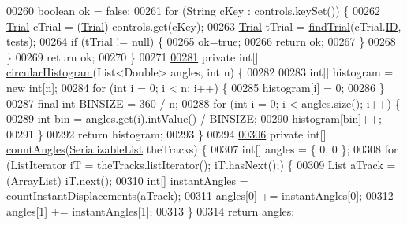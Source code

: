 \begin{DoxyCode}
{00260     \textcolor{keywordtype}{boolean} ok = \textcolor{keyword}{false};
00261     \textcolor{keywordflow}{for} (String cKey : controls.keySet()) \{
00262       \hyperlink{classdata_1_1_trial}{Trial} cTrial = (\hyperlink{classdata_1_1_trial}{Trial}) controls.get(cKey);
00263       \hyperlink{classdata_1_1_trial}{Trial} tTrial = \hyperlink{classanalysis_1_1_chemotaxis_a40fa55bdb0e1b4e7e0f9de92076ab2f9}{findTrial}(cTrial.\hyperlink{classdata_1_1_trial_a317298c3409575f71e43acd3f73ce295}{ID}, tests);
00264       \textcolor{keywordflow}{if} (tTrial != null) \{
00265         ok=\textcolor{keyword}{true};
00266         \textcolor{keywordflow}{return} ok;
00267       \}
00268     \}
00269     \textcolor{keywordflow}{return} ok;
00270   \}
00271 
\hypertarget{_chemotaxis_8java_source_l00281}{}\hyperlink{classanalysis_1_1_chemotaxis_a50fdf81a3460741674381622f16581cb}{00281}   \textcolor{keyword}{private} \textcolor{keywordtype}{int}[] \hyperlink{classanalysis_1_1_chemotaxis_a50fdf81a3460741674381622f16581cb}{circularHistogram}(List<Double> angles, \textcolor{keywordtype}{int} n) \{
00282 
00283     \textcolor{keywordtype}{int}[] histogram = \textcolor{keyword}{new} \textcolor{keywordtype}{int}[n];
00284     \textcolor{keywordflow}{for} (\textcolor{keywordtype}{int} i = 0; i < n; i++) \{
00285       histogram[i] = 0;
00286     \}
00287     \textcolor{keyword}{final} \textcolor{keywordtype}{int} BINSIZE = 360 / n;
00288     \textcolor{keywordflow}{for} (\textcolor{keywordtype}{int} i = 0; i < angles.size(); i++) \{
00289       \textcolor{keywordtype}{int} bin = angles.get(i).intValue() / BINSIZE;
00290       histogram[bin]++;
00291     \}
00292     \textcolor{keywordflow}{return} histogram;
00293   \}
00294 
\hypertarget{_chemotaxis_8java_source_l00306}{}\hyperlink{classanalysis_1_1_chemotaxis_a55deae924cf7ec2004a8fdcd8e185f94}{00306}   \textcolor{keyword}{private} \textcolor{keywordtype}{int}[] \hyperlink{classanalysis_1_1_chemotaxis_a55deae924cf7ec2004a8fdcd8e185f94}{countAngles}(\hyperlink{classdata_1_1_serializable_list}{SerializableList} theTracks) \{
00307     \textcolor{keywordtype}{int}[] angles = \{ 0, 0 \};
00308     \textcolor{keywordflow}{for} (ListIterator iT = theTracks.listIterator(); iT.hasNext();) \{
00309       List aTrack = (ArrayList) iT.next();
00310       \textcolor{keywordtype}{int}[] instantAngles = \hyperlink{classanalysis_1_1_chemotaxis_a668ad1c1240012d6fb70c1fac4a219be}{countInstantDisplacements}(aTrack);
00311       angles[0] += instantAngles[0];
00312       angles[1] += instantAngles[1];
00313     \}
00314     \textcolor{keywordflow}{return} angles;
}
\end{DoxyCode}
